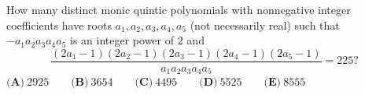 How many distinct monic quintic polynomials with nonnegative integer coefficients have roots $a_1,a_2,a_3,a_4,a_5$ (not necessarily real) such that $-a_1a_2a_3a_4a_5$ is an integer power of $2$ and
\[\dfrac{(2a_1-1)(2a_2-1)(2a_3-1)(2a_4-1)(2a_5-1)}{a_1a_2a_3a_4a_5}=225?\]
$\textbf{(A)}\ 2925 \qquad\textbf{(B)}\ 3654 \qquad\textbf{(C)}\ 4495 \qquad\textbf{(D)}\ 5525 \qquad\textbf{(E)}\ 8555$

